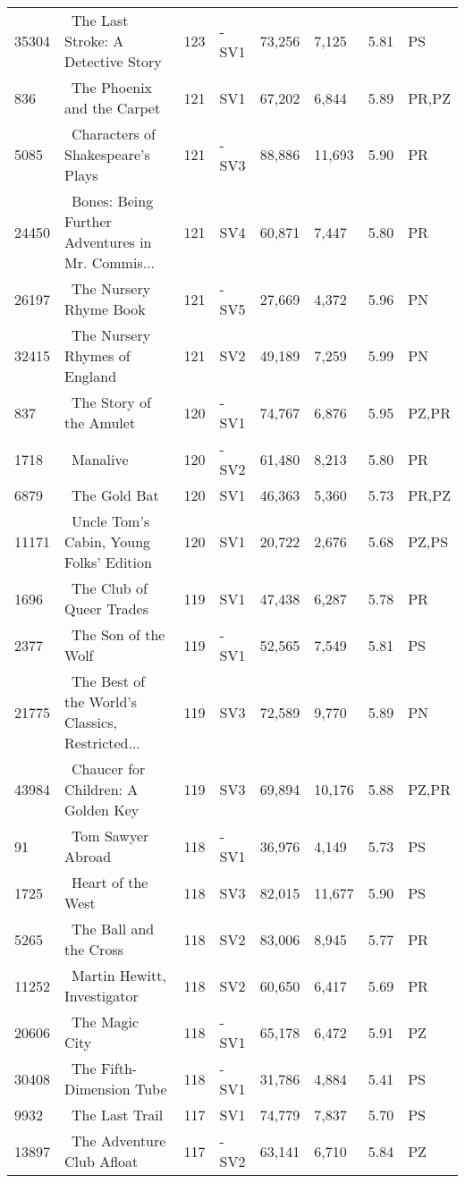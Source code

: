 \begin{longtable}{l | l | l | l | l | l | l | l}
35304 & ~The Last Stroke: A Detective Story & 123 & -SV1 & 73,256 & 7,125 & 5.81 & PS\\
836 & ~The Phoenix and the Carpet & 121 & SV1 & 67,202 & 6,844 & 5.89 & PR,PZ\\
5085 & ~Characters of Shakespeare's Plays & 121 & -SV3 & 88,886 & 11,693 & 5.90 & PR\\
24450 & ~Bones: Being Further Adventures in Mr. Commis... & 121 & SV4 & 60,871 & 7,447 & 5.80 & PR\\
26197 & ~The Nursery Rhyme Book & 121 & -SV5 & 27,669 & 4,372 & 5.96 & PN\\
32415 & ~The Nursery Rhymes of England & 121 & SV2 & 49,189 & 7,259 & 5.99 & PN\\
837 & ~The Story of the Amulet & 120 & -SV1 & 74,767 & 6,876 & 5.95 & PZ,PR\\
1718 & ~Manalive & 120 & -SV2 & 61,480 & 8,213 & 5.80 & PR\\
6879 & ~The Gold Bat & 120 & SV1 & 46,363 & 5,360 & 5.73 & PR,PZ\\
11171 & ~Uncle Tom's Cabin, Young Folks' Edition & 120 & SV1 & 20,722 & 2,676 & 5.68 & PZ,PS\\
1696 & ~The Club of Queer Trades & 119 & SV1 & 47,438 & 6,287 & 5.78 & PR\\
2377 & ~The Son of the Wolf & 119 & -SV1 & 52,565 & 7,549 & 5.81 & PS\\
21775 & ~The Best of the World's Classics, Restricted... & 119 & SV3 & 72,589 & 9,770 & 5.89 & PN\\
43984 & ~Chaucer for Children: A Golden Key & 119 & SV3 & 69,894 & 10,176 & 5.88 & PZ,PR\\
91 & ~Tom Sawyer Abroad & 118 & -SV1 & 36,976 & 4,149 & 5.73 & PS\\
1725 & ~Heart of the West & 118 & SV3 & 82,015 & 11,677 & 5.90 & PS\\
5265 & ~The Ball and the Cross & 118 & SV2 & 83,006 & 8,945 & 5.77 & PR\\
11252 & ~Martin Hewitt, Investigator & 118 & SV2 & 60,650 & 6,417 & 5.69 & PR\\
20606 & ~The Magic City & 118 & -SV1 & 65,178 & 6,472 & 5.91 & PZ\\
30408 & ~The Fifth-Dimension Tube & 118 & -SV1 & 31,786 & 4,884 & 5.41 & PS\\
9932 & ~The Last Trail & 117 & SV1 & 74,779 & 7,837 & 5.70 & PS\\
13897 & ~The Adventure Club Afloat & 117 & -SV2 & 63,141 & 6,710 & 5.84 & PZ\\

\end{longtable}
